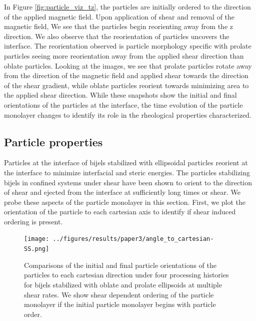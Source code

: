 In Figure \ref{fig:particle_viz_tz}, the particles are initially ordered to the direction of the applied magnetic field. Upon application of shear and removal
of the magnetic field, We see that the particles begin reorienting away from the z direction. We also observe that the reorientation of particles uncovers the interface.
The reorientation observed is particle morphology specific with prolate particles seeing more reorientation away from the applied shear direction than oblate particles.
Looking at the images, we see that prolate particles rotate away from the direction of the magnetic field and applied shear towards the direction of the shear gradient,
while oblate particles reorient towards minimizing area to the applied shear direction. While these snapshots show the initial and final orientations of the particles at the
interface, the time evolution of the particle monolayer changes to identify its role in the rheological properties characterized.

\subsection{Particle properties}

Particles at the interface of bijels stabilized with ellipsoidal particles reorient at the interface to minimize interfacial and
steric energies. \cite{gunther_timescales_2014} The particles stabilizing bijels in confined systems under shear have been shown to
orient to the direction of shear and ejected from the interface at sufficiently long times or shear.\cite{bonaccorso_shear_2020} 
We probe these aspects of the particle monolayer in this section. First, we plot the orientation of the particle to each cartesian axis 
to identify if shear induced ordering is present.

\begin{figure} 
    \centering 
    \texttt{[image: ../figures/results/paper3/angle\_to\_cartesian-SS.png]} 
    \caption{Comparisons of the initial and final particle orientations of the particles to each cartesian direction under
             four processing histories for bijels stabilized with oblate and prolate ellipsoids at multiple shear rates. We show
             shear dependent ordering of the particle monolayer if the initial particle monolayer begins with particle order.} 
    \label{fig:particle_orientation_cartesian_shear} 
\end{figure}

